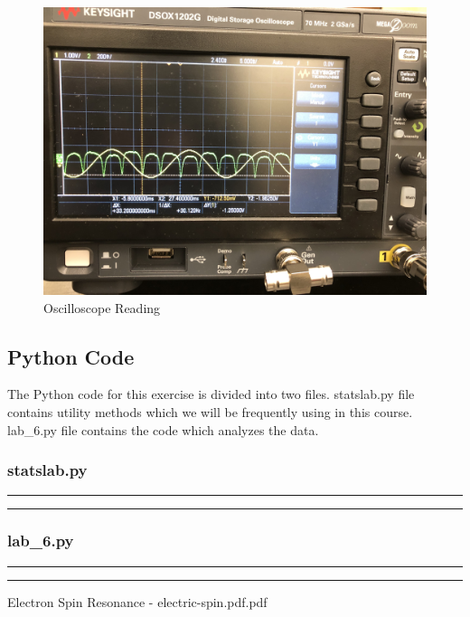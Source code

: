 \documentclass[letterpaper,12pt]{article}
\begin{document}
\begin{figure}[H]
  \centering
  \includegraphics[width=1.0\linewidth]{../code/Pankaj/lab6_osc.jpg}    
  \begin{center}
    \begin{center}   
    \end{center}  \end{center}
  \caption{Oscilloscope Reading}
  \label{osc}
\end{figure}

\pagebreak

\subsection{Python Code}

The Python code for this exercise is divided into two files. statslab.py file contains utility methods
which we will be frequently using in this course. lab\_6.py file contains the code which analyzes
the data.

\subsubsection{statslab.py}
\noindent\rule{\textwidth}{1pt}

\noindent\rule{\textwidth}{1pt}

\pagebreak

\subsubsection{lab\_6.py}
\noindent\rule{\textwidth}{1pt}

\noindent\rule{\textwidth}{1pt}

\pagebreak

\begin{thebibliography}{99}

 Electron Spin Resonance - electric-spin.pdf.pdf

\end{thebibliography}
\end{document}
